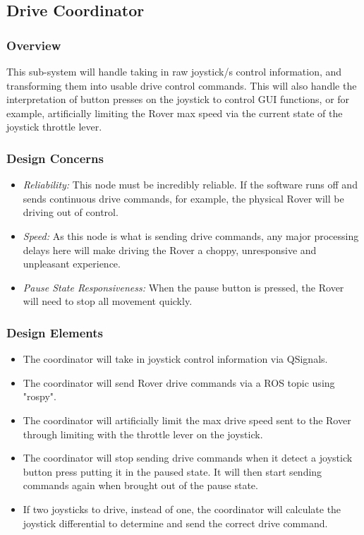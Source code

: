 \subsection{Drive Coordinator}
\subsubsection{Overview}
This sub-system will handle taking in raw joystick/s control information, and transforming them into usable drive control commands.
This will also handle the interpretation of button presses on the joystick to control GUI functions, or for example, artificially limiting the Rover max speed via the current state of the joystick throttle lever.

\subsubsection{Design Concerns}
\begin{itemize}
\item \textit{Reliability:} This node must be incredibly reliable.
If the software runs off and sends continuous drive commands, for example, the physical Rover will be driving out of control.
\item \textit{Speed:} As this node is what is sending drive commands, any major processing delays here will make driving the Rover a choppy, unresponsive and unpleasant experience.
\item \textit{Pause State Responsiveness:} When the pause button is pressed, the Rover will need to stop all movement quickly.
\end{itemize}

\subsubsection{Design Elements}
\begin{itemize}
\item The coordinator will take in joystick control information via QSignals.
\item The coordinator will send Rover drive commands via a ROS topic using "rospy".
\item The coordinator will artificially limit the max drive speed sent to the Rover through limiting with the throttle lever on the joystick.
\item The coordinator will stop sending drive commands when it detect a joystick button press putting it in the paused state.
It will then start sending commands again when brought out of the pause state.
\item If two joysticks to drive, instead of one, the coordinator will calculate the joystick differential to determine and send the correct drive command. 
\end{itemize}

